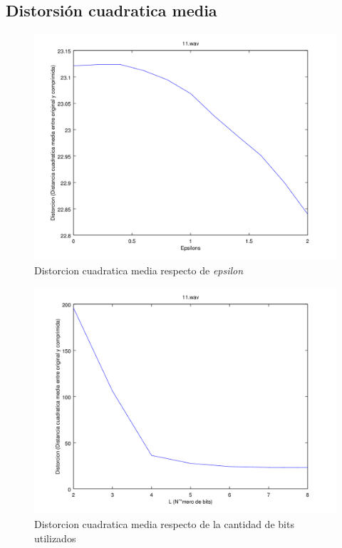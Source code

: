 \documentclass[spanish]{scrartcl}
\begin{document}
\subsection{Distorsión cuadratica media}

\begin{figure}[!htbp]
    \centering
    \includegraphics[interpolate=false, scale=0.09]{plots/11_epsi_distortion}
    \caption{Distorcion cuadratica media respecto de \textit{epsilon}}
    \label{fig:dist_epsi}
\end{figure}

\begin{figure}[!htbp]
    \centering
    \includegraphics[interpolate=false, scale=0.09]{plots/11_bits_distortion}
    \caption{Distorcion cuadratica media respecto de la cantidad de bits utilizados}
    \label{fig:dist_bit}
\end{figure}
\end{document}

